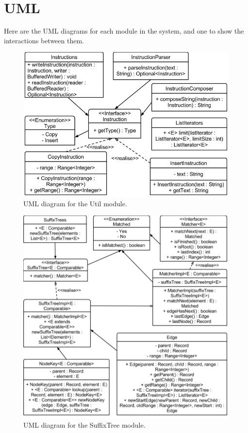 \section{UML}

Here are the UML diagrams for each module in the system, and one to show the interactions between them.

\begin{figure}[H]
\begin{center}
\includegraphics[width=\textwidth]{design/diffrUML-util.png}
\end{center}
\caption{UML diagram for the Util module.}
\label{fig:utilUML}
\end{figure}

\begin{figure}[H]
\begin{center}
\includegraphics[width=\textwidth]{design/diffrUML-suffixtree.png}
\end{center}
\caption{UML diagram for the SuffixTree module.}
\label{fig:suffixTreeUML}
\end{figure}


